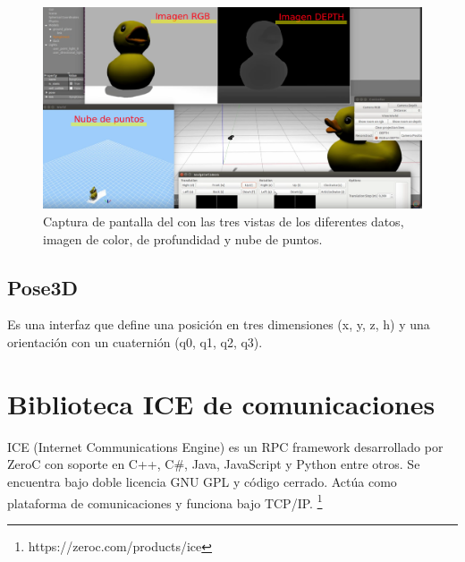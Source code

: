 \begin{figure}[th]
\centering
\includegraphics[scale=0.2]{Figures/rgbdviewer2.png}
\decoRule
\caption[rgbdviewer2]{Captura de pantalla del con las tres vistas de los diferentes datos, imagen de color, de profundidad y nube de puntos.}
\label{fig:RgbdViewer}
\end{figure}

\subsection{Pose3D}

Es una interfaz que define una posición en tres dimensiones (x, y, z, h) y una orientación con un cuaternión (q0, q1, q2, q3).



\section{Biblioteca ICE de comunicaciones}

ICE (Internet Communications Engine) es un RPC framework desarrollado por ZeroC con soporte en C++, C\#, Java, JavaScript y Python entre otros. Se encuentra bajo doble licencia GNU GPL y código cerrado. Actúa como plataforma de comunicaciones y funciona bajo TCP/IP. \footnote{https://zeroc.com/products/ice}

